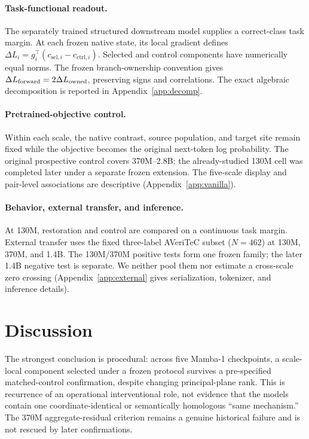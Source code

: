 \documentclass{article}
\begin{document}
\paragraph{Task-functional readout.}
The separately trained structured downstream model supplies a correct-class task margin. At each frozen native state, its local gradient defines
$\Delta L_i=g_i^\top(c_{\mathrm{sel},i}-c_{\mathrm{ctrl},i})$.
Selected and control components have numerically equal norms. The frozen branch-ownership convention gives
$\Delta L_{\rm forward}=2\Delta L_{\rm owned}$, preserving signs and correlations. The exact algebraic decomposition is reported in Appendix~\ref{app:decomp}.

\paragraph{Pretrained-objective control.}
Within each scale, the native contrast, source population, and target site remain fixed while the objective becomes the original next-token log probability. The original prospective control covers 370M--2.8B; the already-studied 130M cell was completed later under a separate frozen extension. The five-scale display and pair-level associations are descriptive (Appendix~\ref{app:vanilla}).

\paragraph{Behavior, external transfer, and inference.}
At 130M, restoration and control are compared on a continuous task margin. External transfer uses the fixed three-label AVeriTeC subset ($N=462$) at 130M, 370M, and 1.4B. The 130M/370M positive tests form one frozen family; the later 1.4B negative test is separate. We neither pool them nor estimate a cross-scale zero crossing (Appendix~\ref{app:external} gives serialization, tokenizer, and inference details).

\section{Discussion}
\label{sec:discussion}

The strongest conclusion is procedural: across five Mamba-1 checkpoints, a scale-local component selected under a frozen protocol survives a pre-specified matched-control confirmation, despite changing principal-plane rank. This is recurrence of an operational interventional role, not evidence that the models contain one coordinate-identical or semantically homologous ``same mechanism.'' The 370M aggregate-residual criterion remains a genuine historical failure and is not rescued by later confirmations.
\end{document}

